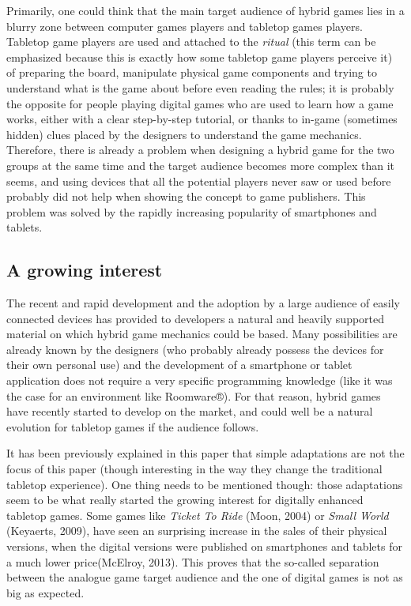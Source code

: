Primarily, one could think that the main target audience of hybrid games lies in a blurry zone between computer games players and tabletop games players. Tabletop game players are used and attached to the \textit{ritual} (this term can be emphasized because this is exactly how some tabletop game players perceive it) of preparing the board, manipulate physical game components and trying to understand what is the game about before even reading the rules; it is probably the opposite for people playing digital games who are used to learn how a game works, either with a clear step-by-step tutorial, or thanks to in-game (sometimes hidden) clues placed by the designers to understand the game mechanics. Therefore, there is already a problem when designing a hybrid game for the two groups at the same time and the target audience becomes more complex than it seems, and using devices that all the potential players never saw or used before probably did not help when showing the concept to game publishers. This problem was solved by the rapidly increasing popularity of smartphones and tablets.
\subsection{A growing interest}
The recent and rapid development and the adoption by a large audience of easily connected devices has provided to developers a natural and heavily supported material on which hybrid game mechanics could be based. Many possibilities are already known by the designers (who probably already possess the devices for their own personal use) and the development of a smartphone or tablet application does not require a very specific programming knowledge (like it was the case for an environment like Roomware®). For that reason, hybrid games have recently started to develop on the market, and could well be a natural evolution for tabletop games if the audience follows.

It has been previously explained in this paper that simple adaptations are not the focus of this paper (though interesting in the way they change the traditional tabletop experience). One thing needs to be mentioned though: those adaptations seem to be what really started the growing interest for digitally enhanced tabletop games. Some games like \textit{Ticket To Ride} (Moon, 2004)\cite{game:ticket} or \textit{Small World} (Keyaerts, 2009)\cite{game:tw}, have seen an surprising increase in the sales of their physical versions, when the digital versions were published on smartphones and tablets for a much lower price(McElroy, 2013)\cite{web:poly}. This proves that the so-called separation between the analogue game target audience and the one of digital games is not as big as expected.

